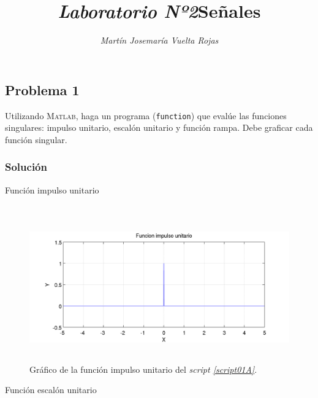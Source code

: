 \documentclass[a4paper,12pt,final]{article}
\begin{document}
  \title{\textit{\Large Laboratorio Nº2}\linebreak{}\linebreak{}\textbf{\Huge Señales}}
  \author{\emph{Martín Josemaría Vuelta Rojas}}
  \maketitle

  \subsection*{Problema 1}
    \noindent Utilizando \textsc{Matlab}, haga un programa (\texttt{function})
    que evalúe las funciones singulares: impulso unitario, escalón unitario
    y función rampa. Debe graficar cada función singular.

    \subsubsection*{Solución}
      \begin{listing}[H]
        \caption{Función impulso unitario}
        \label{script01A}
        \inputminted{matlab}{./laboratorio_2/impulso.m}
      \end{listing}

      \begin{figure}[H]
        \caption{Gráfico de la función impulso unitario del \emph{script \ref{script01A}}.}
        \label{script01Afigure}
        \includegraphics[height=2.5in]{./laboratorio_2/problema01_a.png}
      \end{figure}
      \vspace{\fill}

      \newpage
      \begin{listing}[H]
        \caption{Función escalón unitario}
        \label{script01B}
        \inputminted{matlab}{./laboratorio_2/escalon.m}
      \end{listing}
\end{document}
